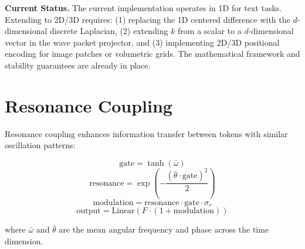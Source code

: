 \documentclass{article}
\begin{document}
\textbf{Current Status.} The current implementation operates in 1D for text tasks. Extending to 2D/3D requires: (1) replacing the 1D centered difference with the $d$-dimensional discrete Laplacian, (2) extending $k$ from a scalar to a $d$-dimensional vector in the wave packet projector, and (3) implementing 2D/3D positional encoding for image patches or volumetric grids. The mathematical framework and stability guarantees are already in place.

\section{Resonance Coupling}

Resonance coupling enhances information transfer between tokens with similar oscillation patterns:

\begin{equation}
\text{gate} = \tanh(\bar{\omega})
\end{equation}
\begin{equation}
\text{resonance} = \exp\!\left(-\frac{(\bar{\theta} \cdot \text{gate})^2}{2}\right)
\end{equation}
\begin{equation}
\text{modulation} = \text{resonance} \cdot \text{gate} \cdot \sigma_r
\end{equation}
\begin{equation}
\text{output} = \text{Linear}(F \cdot (1 + \text{modulation}))
\end{equation}

where $\bar{\omega}$ and $\bar{\theta}$ are the mean angular frequency and phase across the time dimension.
\end{document}
